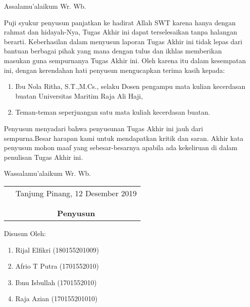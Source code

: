 \documentclass{jtetiskripsi}
\begin{document}
\cover


\preface
Assalamu'alaikum Wr. Wb.

\vspace{0.5cm}

Puji syukur penyusun panjatkan ke hadirat Allah SWT karena hanya dengan rahmat dan hidayah-Nya, Tugas Akhir ini dapat terselesaikan tanpa halangan berarti. Keberhasilan dalam menyusun laporan Tugas Akhir ini tidak lepas dari bantuan berbagai pihak yang mana dengan tulus dan ikhlas memberikan masukan guna sempurnanya Tugas Akhir ini. Oleh karena itu dalam kesempatan ini, dengan kerendahan hati penyusun mengucapkan terima kasih kepada:

\begin{enumerate}
\item{Ibu Nola Ritha, S.T.,M.Cs., selaku Dosen pengampu mata kulian kecerdasan buatan Universitas Maritim Raja Ali Haji},
\item Teman-teman seperjuangan satu mata kuliah kecerdasan buatan.

\end{enumerate}


Penyusun menyadari bahwa penyusunan Tugas Akhir ini jauh dari sempurna.Besar harapan kami untuk mendapatkan kritik dan saran. Akhir kata penyusun mohon maaf yang sebesar-besarnya apabila ada kekeliruan di dalam penulisan Tugas Akhir ini.

\vspace{0.5cm}

Wassalamu'alaikum Wr. Wb.

\begin{tabular}{p{7.5cm}c}
&Tanjung Pinang, 12 Desember 2019\\
&\\
&\\
&\textbf{Penyusun}
\end{tabular}

\newpage
\noindent Disusun Oleh:
\begin{enumerate}
	\item Rijal Elfikri (180155201009)
	\item Afrio T Putra (1701552010)
	\item Ibnu Isbullah (1701552010)
	\item Raja Azian (170155201010)
\end{enumerate}
\end{document}
